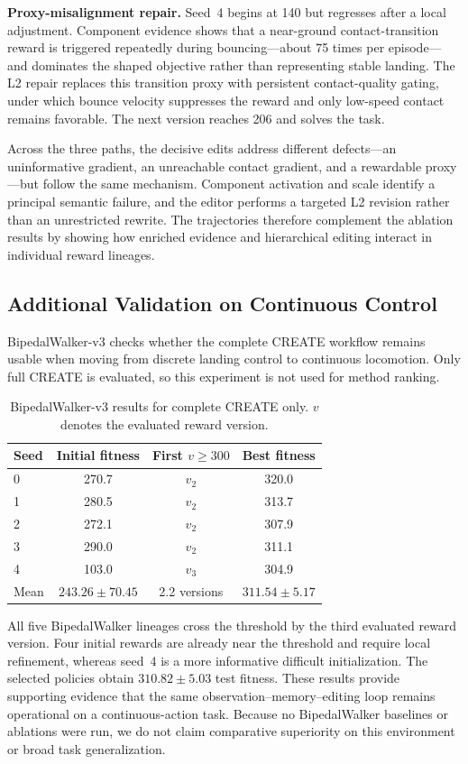 \textbf{Proxy-misalignment repair.} Seed~4 begins at 140 but regresses after a local adjustment. Component evidence shows that a near-ground contact-transition reward is triggered repeatedly during bouncing---about 75 times per episode---and dominates the shaped objective rather than representing stable landing. The L2 repair replaces this transition proxy with persistent contact-quality gating, under which bounce velocity suppresses the reward and only low-speed contact remains favorable. The next version reaches 206 and solves the task.

Across the three paths, the decisive edits address different defects---an uninformative gradient, an unreachable contact gradient, and a rewardable proxy---but follow the same mechanism. Component activation and scale identify a principal semantic failure, and the editor performs a targeted L2 revision rather than an unrestricted rewrite. The trajectories therefore complement the ablation results by showing how enriched evidence and hierarchical editing interact in individual reward lineages.

\subsection{Additional Validation on Continuous Control}
BipedalWalker-v3 checks whether the complete CREATE workflow remains usable when moving from discrete landing control to continuous locomotion. Only full CREATE is evaluated, so this experiment is not used for method ranking.

\begin{table}[t]
\caption{BipedalWalker-v3 results for complete CREATE only. $v$ denotes the evaluated reward version.}
\label{tab:bipedal}
\centering
\scriptsize
\setlength{\tabcolsep}{3.0pt}
\begin{tabular}{lccc}
\toprule
Seed & Initial fitness & First $v\!\geq\!300$ & Best fitness \\
\midrule
0 & 270.7 & $v_2$ & 320.0 \\
1 & 280.5 & $v_2$ & 313.7 \\
2 & 272.1 & $v_2$ & 307.9 \\
3 & 290.0 & $v_2$ & 311.1 \\
4 & 103.0 & $v_3$ & 304.9 \\
\midrule
Mean & $243.26\pm70.45$ & 2.2 versions & $311.54\pm5.17$ \\
\bottomrule
\end{tabular}
\end{table}

All five BipedalWalker lineages cross the threshold by the third evaluated reward version. Four initial rewards are already near the threshold and require local refinement, whereas seed~4 is a more informative difficult initialization. The selected policies obtain $310.82\pm5.03$ test fitness. These results provide supporting evidence that the same observation--memory--editing loop remains operational on a continuous-action task. Because no BipedalWalker baselines or ablations were run, we do not claim comparative superiority on this environment or broad task generalization.
